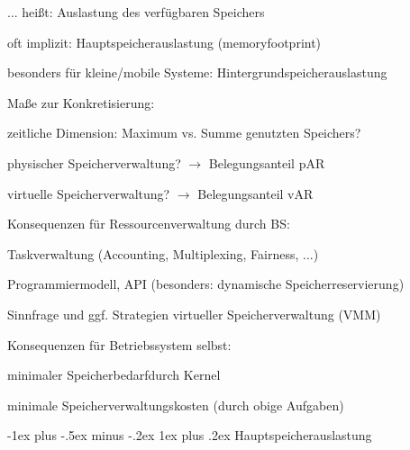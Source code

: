 \documentclass[a4paper]{article}
\makeatletter
\renewcommand{\subsubsection}{\@startsection{subsubsection}{3}{0mm}%
 {-1ex plus -.5ex minus -.2ex}%
 {1ex plus .2ex}%
 {\normalfont\small\bfseries}}
\makeatother
\begin{document}
\begin{multicols}{3}
    \begin{itemize*}
        \item
        ... heißt: Auslastung des verfügbaren Speichers
        \begin{itemize*}
            \item oft implizit: Hauptspeicherauslastung (memoryfootprint)
            \item besonders für kleine/mobile Systeme: Hintergrundspeicherauslastung
        \end{itemize*}
        \item
        Maße zur Konkretisierung:
        \begin{itemize*}
            \item zeitliche Dimension: Maximum vs. Summe genutzten Speichers?
            \item physischer Speicherverwaltung? $\rightarrow$  Belegungsanteil pAR
            \item virtuelle Speicherverwaltung? $\rightarrow$  Belegungsanteil vAR
        \end{itemize*}
        \item
        Konsequenzen für Ressourcenverwaltung durch BS:
        \begin{itemize*}
            \item Taskverwaltung (Accounting, Multiplexing, Fairness, ...)
            \item Programmiermodell, API (besonders: dynamische Speicherreservierung)
            \item Sinnfrage und ggf. Strategien virtueller Speicherverwaltung (VMM)
        \end{itemize*}
        \item
        Konsequenzen für Betriebssystem selbst:
        \begin{itemize*}
            \item minimaler Speicherbedarfdurch Kernel
            \item minimale Speicherverwaltungskosten (durch obige Aufgaben)
        \end{itemize*}
    \end{itemize*}


    \subsubsection{Hauptspeicherauslastung}

    \begin{itemize*}
        \item
    \end{itemize*}


\end{multicols}
\end{document}
